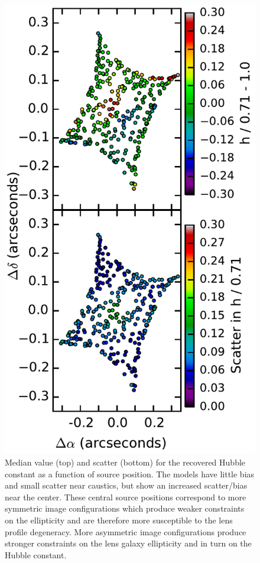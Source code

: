 \documentclass{emulateapj}
\begin{document}
\begin{figure}
\begin{center}
\includegraphics[width=1\columnwidth]{h_src_pos.pdf}
\caption{\label{fig:srcpos}
Median value (top) and scatter (bottom) for the recovered Hubble constant as a function of source position. The models have little bias and small scatter near caustics, but show an increased scatter/bias near the center. These central source positions correspond to more symmetric image configurations which produce weaker constraints on the ellipticity and are therefore more susceptible to the lens profile degeneracy. More asymmetric image configurations produce stronger constraints on the lens galaxy ellipticity and in turn on the Hubble constant.
}
\end{center}
\end{figure}
\end{document}
